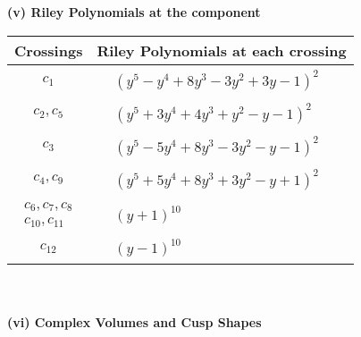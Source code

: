 \documentclass[1p]{elsarticle_modified}
\theoremstyle{definition}
\begin{document}
\newpage\renewcommand{\arraystretch}{1}
\flushleft \textbf{(v) Riley Polynomials at the component}\newline \\
\begin{tabular}{m{50pt}|m{274pt}}
Crossings & \hspace{64pt}Riley Polynomials at each crossing \\
\hline $$\begin{aligned}c_{1}\end{aligned}$$&$\begin{aligned}
&(y^5- y^4+8 y^3-3 y^2+3 y-1)^2
\end{aligned}$\\
\hline $$\begin{aligned}c_{2},c_{5}\end{aligned}$$&$\begin{aligned}
&(y^5+3 y^4+4 y^3+y^2- y-1)^2
\end{aligned}$\\
\hline $$\begin{aligned}c_{3}\end{aligned}$$&$\begin{aligned}
&(y^5-5 y^4+8 y^3-3 y^2- y-1)^2
\end{aligned}$\\
\hline $$\begin{aligned}c_{4},c_{9}\end{aligned}$$&$\begin{aligned}
&(y^5+5 y^4+8 y^3+3 y^2- y+1)^2
\end{aligned}$\\
\hline $$\begin{aligned}c_{6},c_{7},c_{8}\\c_{10},c_{11}\end{aligned}$$&$\begin{aligned}
&(y+1)^{10}
\end{aligned}$\\
\hline $$\begin{aligned}c_{12}\end{aligned}$$&$\begin{aligned}
&(y-1)^{10}
\end{aligned}$\\
\hline
\end{tabular}\\~\\
\newpage\flushleft \textbf{(vi) Complex Volumes and Cusp Shapes}
\end{document}
